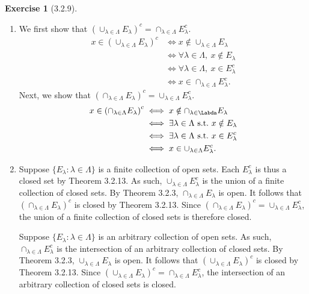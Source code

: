 \documentclass{amsart}
\theoremstyle{definition}
\newtheorem{exercise}{Exercise}
\newcommand{\st}{\mathrel{:}}
\begin{document}
\begin{exercise}[3.2.9]
  \begin{enumerate}[label={(\alph*)}]
    \item We first show that ${(\cup_{\lambda \in \Lambda} E_\lambda)}^c =
      \cap_{\lambda \in \Lambda} E_\lambda^c$.
      \begin{align*}
        x \in {(\cup_{\lambda \in \Lambda} E_\lambda)}^c &\iff x \notin
        \cup_{\lambda \in \Lambda} E_\lambda \\
        &\iff \forall \lambda \in \Lambda,\ x \notin E_\lambda \\
        &\iff \forall \lambda \in \Lambda,\ x \in E_\lambda^c \\
        &\iff x \in \cap_{\lambda \in \Lambda} E_\lambda^c.
      \end{align*}
      Next, we show that ${(\cap_{\lambda \in \Lambda} E_\lambda)}^c =
      \cup_{\lambda \in \Lambda} E_\lambda^c$.
      \begin{align*}
        x \in {(\cap_{\lambda \in \Lambda} E_\lambda)}^c &\iff x \notin
        \cap_{\lambda \in \Labda} E_\lambda \\
        &\iff \exists \lambda \in \Lambda\ \text{s.t.}\ x \notin E_\lambda \\
        &\iff \exists \lambda \in \Lambda\ \text{s.t.}\ x \in E_\lambda^c \\
        &\iff x \in \cup_{\lambda \in \Lambda} E_\lambda^c.
      \end{align*}
    \item Suppose $\{E_\lambda \st \lambda \in \Lambda\}$ is a finite collection
      of open sets. Each $E_\lambda^c$ is thus a closed set by Theorem 3.2.13.
      As such, $\cup_{\lambda \in \Lambda} E_\lambda^c$ is the union of a finite
      collection of closed sets. By Theorem 3.2.3, $\cap_{\lambda \in \Lambda}
      E_\lambda$ is open. It follows that ${(\cap_{\lambda \in \Lambda}
      E_\lambda)}^c$ is closed by Theorem 3.2.13. Since ${(\cap_{\lambda \in
      \Lambda} E_\lambda)}^c= \cup_{\lambda \in \Lambda} E_\lambda^c$, the union
      of a finite collection of closed sets is therefore closed.

      Suppose $\{E_\lambda \st \lambda \in \Lambda\}$ is an arbitrary
      collection of open sets. As such, $\cap_{\lambda \in \Lambda} E_\lambda^c$
      is the intersection of an arbitrary collection of closed sets. By Theorem
      3.2.3, $\cup_{\lambda \in \Lambda} E_\lambda$ is open. It follows that
      ${(\cup_{\lambda \in \Lambda} E_\lambda)}^c$ is closed by Theorem 3.2.13.
      Since ${(\cup_{\lambda \in \Lambda} E_\lambda)}^c = \cap_{\lambda \in
      \Lambda} E_\lambda^c$, the intersection of an arbitrary collection of
      closed sets is closed.
  \end{enumerate}
\end{exercise}
\end{document}
